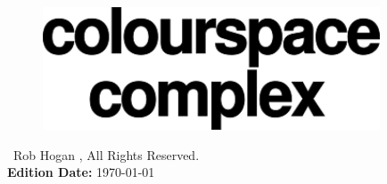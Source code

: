 
\thispagestyle{empty}%
\vspace*{\fill}
\begin{figure}[H]
    \centering
      \includegraphics[width=10cm]{src/cover/title_page_colorspace.png}%
\end{figure}
\vspace*{\fill}

\clearpage

\vspace*{\fill}
\textcopyright\ Rob Hogan \the\year{}, All Rights Reserved. \\
\textbf{Edition Date:} \today

\doclicenseThis
\clearpage
